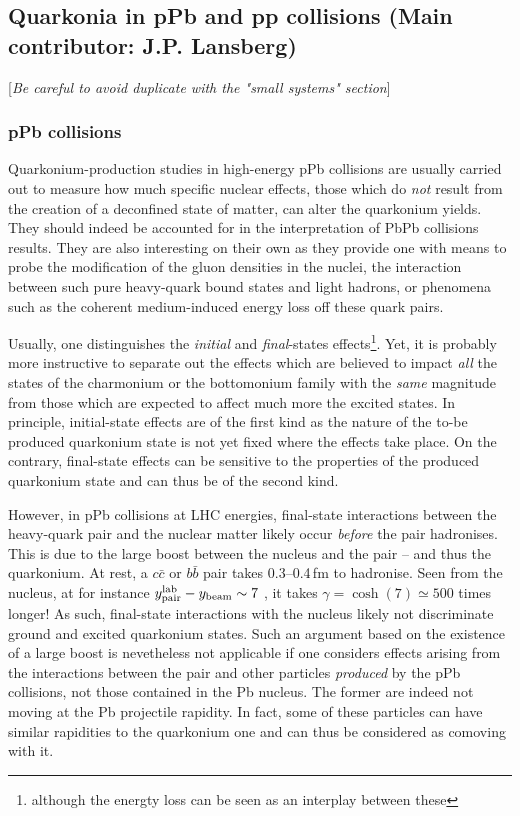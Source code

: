 \documentclass[../report.tex]{subfiles}
\begin{document}

\clearpage

\subsection{Quarkonia in pPb and pp collisions (Main contributor: J.P. Lansberg)}

[{\it Be careful to avoid duplicate with the "small systems" section}]


\subsubsection{pPb collisions}
 Quarkonium-production studies in high-energy pPb collisions are usually carried out to measure how much specific nuclear effects, those which do {\it not} result from the creation of a deconfined state of matter, can alter the quarkonium yields. They should indeed be accounted for in the interpretation of  PbPb collisions results. They are also interesting on their own as they provide one with means to probe the modification of the gluon densities in the nuclei, the interaction between such pure heavy-quark bound states and light hadrons, or phenomena such as the coherent medium-induced energy loss off these quark pairs.
 
 Usually, one distinguishes the {\it initial} and {\it final}-states effects\footnote{although the energty loss can be seen as an interplay between these}. Yet, it is probably more instructive to separate out the effects which are believed to impact {\it all} the states of the charmonium or the bottomonium family with the {\it same} magnitude from those which are expected to affect much more the excited states. In principle, initial-state effects are of the first kind as the nature of the to-be produced quarkonium state is not yet fixed where the effects take place.  On the contrary, final-state effects can be sensitive to the properties of the produced quarkonium state and can thus be of the second kind.
 
However, in pPb collisions at LHC energies, final-state interactions between the heavy-quark pair and the nuclear matter likely occur {\it before} the pair hadronises. This is due to the large boost between the nucleus and the pair -- and thus the quarkonium. At rest, a $c \bar c$ or $b\bar b$ pair takes 0.3--0.4\,fm to hadronise. Seen from the nucleus, at for instance $y^{\rm lab}_{\rm pair}-y_{\rm beam} \sim 7$ , it takes $\gamma=\cosh(7) \simeq 500$ times longer! As such, final-state interactions with the nucleus likely not discriminate ground and excited quarkonium states. Such an argument based on the existence of a large boost is nevetheless not applicable if one considers effects arising from the interactions between the pair and other particles {\it produced} by the pPb collisions, not those contained in the Pb nucleus. The former are indeed not moving at the Pb projectile rapidity. In fact, some of these particles can have similar rapidities to the quarkonium one and can thus be considered as comoving with it.
 
\end{document}
